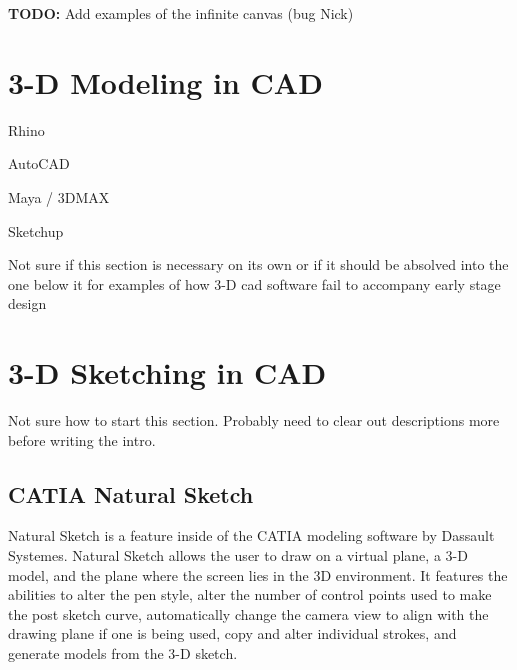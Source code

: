 \documentclass[12pt]{report}
\begin{document}
\textbf{TODO:} Add examples of the infinite canvas (bug Nick)


\section{3-D Modeling in CAD}

Rhino

AutoCAD

Maya / 3DMAX

Sketchup

Not sure if this section is necessary on its own or if it should be absolved into the one below it for examples of how 3-D cad software fail to accompany early stage design

\section{3-D Sketching in CAD}

Not sure how to start this section. Probably need to clear out descriptions more before writing the intro. 

\subsection{CATIA Natural Sketch}

Natural Sketch is a feature inside of the CATIA modeling software by Dassault Systemes. Natural Sketch allows the user to draw on a virtual plane, a 3-D model, and the plane where the screen lies in the 3D environment. It features the abilities to alter the pen style, alter the number of control points used to make the post sketch curve, automatically change the camera view to align with the drawing plane if one is being used, copy and alter individual strokes, and generate models from the 3-D sketch.
\end{document}
